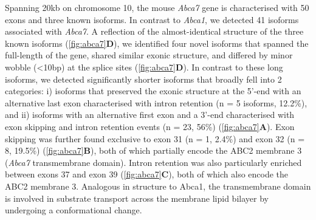 Spanning 20kb on chromosome 10, the mouse \textit{Abca7} gene is characterised with 50 exons and three known isoforms. In contrast to \textit{Abca1}, we detected 41 isoforms associated with \textit{Abca7}. A reflection of the almost-identical structure of the three known isoforms (\cref{fig:abca7}\textbf{D}), we identified four novel isoforms that spanned the full-length of the gene, shared similar exonic structure, and differed by minor wobble (<10bp) at the splice sites (\cref{fig:abca7}\textbf{D}). In contrast to these long isoforms, we detected significantly shorter isoforms that broadly fell into 2 categories: i) isoforms that preserved the exonic structure at the 5'-end with an alternative last exon characterised with intron retention (n = 5 isoforms, 12.2\%), and ii) isoforms with an alternative first exon and a 3'-end characterised with exon skipping and intron retention events (n = 23, 56\%) (\cref{fig:abca7}\textbf{A}). Exon skipping was further found exclusive to exon 31 (n = 1, 2.4\%) and exon 32 (n = 8, 19.5\%) (\cref{fig:abca7}\textbf{B}), both of which partially encode the ABC2 membrane 3 (\textit{Abca7} transmembrane domain)\cite{DeRoeck2019a}. Intron retention was also particularly enriched between exons 37 and exon 39 (\cref{fig:abca7}\textbf{C}), both of which also encode the ABC2 membrane 3. Analogous in structure to Abca1, the transmembrane domain is involved in substrate transport across the membrane lipid bilayer by undergoing a conformational change. 

